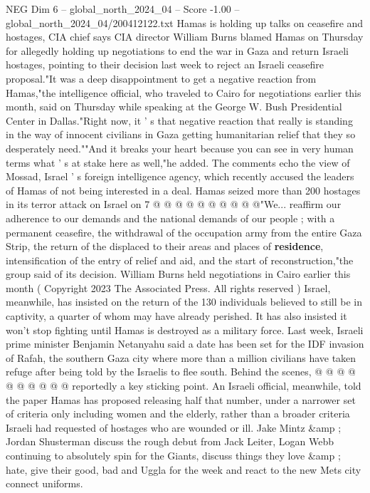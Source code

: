 \begin{textsample}{NEG Dim 6 – global\_north\_2024\_04 – Score -1.00 – global\_north\_2024\_04/200412122.txt}  \label{ex:f6_neg_339}
Hamas is holding up talks on ceasefire and hostages, CIA chief says CIA director William Burns blamed Hamas on Thursday for allegedly holding up negotiations to end the war in Gaza and return Israeli hostages, pointing to their decision last week to reject an Israeli ceasefire proposal."It was a deep disappointment to get a negative reaction from Hamas,"the intelligence official, who traveled to Cairo for negotiations earlier this month, said on Thursday while speaking at the George W.
Bush Presidential Center in Dallas."Right now, it ' s that negative reaction that really is standing in the way of innocent civilians in Gaza getting humanitarian relief that they so desperately need.""And it breaks your heart because you can see in very human terms what ' s at stake here as well,"he added.
The comments echo the view of Mossad, Israel ' s foreign intelligence agency, which recently accused the leaders of Hamas of not being interested in a deal.
Hamas seized more than 200 hostages in its terror attack on Israel on 7 @ @ @ @ @ @ @ @ @ @"We... reaffirm our adherence to our demands and the national demands of our people ; with a permanent ceasefire, the withdrawal of the occupation army from the entire Gaza Strip, the return of the displaced to their areas and places of \textbf{residence}, intensification of the entry of relief and aid, and the start of reconstruction,"the group said of its decision.
William Burns held negotiations in Cairo earlier this month ( Copyright 2023 The Associated Press.
All rights reserved ) Israel, meanwhile, has insisted on the return of the 130 individuals believed to still be in captivity, a quarter of whom may have already perished.
It has also insisted it won't stop fighting until Hamas is destroyed as a military force.
Last week, Israeli prime minister Benjamin Netanyahu said a date has been set for the IDF invasion of Rafah, the southern Gaza city where more than a million civilians have taken refuge after being told by the Israelis to flee south.
Behind the scenes, @ @ @ @ @ @ @ @ @ @ reportedly a key sticking point.
An Israeli official, meanwhile, told the paper Hamas has proposed releasing half that number, under a narrower set of criteria only including women and the elderly, rather than a broader criteria Israeli had requested of hostages who are wounded or ill.
Jake Mintz \&amp ; Jordan Shusterman discuss the rough debut from Jack Leiter, Logan Webb continuing to absolutely spin for the Giants, discuss things they love \&amp ; hate, give their good, bad and Uggla for the week and react to the new Mets city connect uniforms.

\end{textsample}

